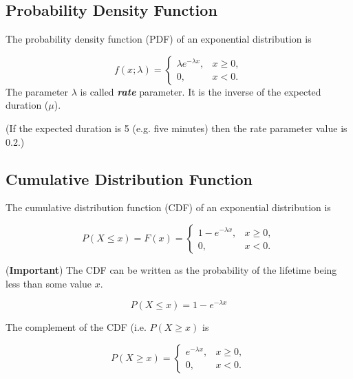 \documentclass[a4paper,12pt]{article}
\begin{document}
\subsection*{Probability Density Function}

\noindent The probability density function (PDF) of an exponential distribution is

\[
f(x;\lambda) = \begin{cases}
\lambda e^{-\lambda x}, & x \ge 0, \\
0, & x < 0.
\end{cases}\]
\noindent The parameter $\lambda$  is called \textbf{\emph{rate}} parameter. It is the inverse of the expected duration ($\mu$).\\ \bigskip

\noindent (If the expected duration is 5 (e.g. five minutes) then the rate parameter value is 0.2.)




\subsection*{Cumulative Distribution Function}
\noindent The cumulative distribution function (CDF) of an exponential distribution is

\[
P(X \leq x) = F(x) = \begin{cases}
1-e^{-\lambda x}, & x \ge 0, \\
0, & x < 0.
\end{cases}\]

\noindent (\textbf{Important}) The CDF can be written as the probability of the lifetime being less than some value $x$.

\[ P(X \leq x) = 1-e^{-\lambda x} \]



\noindent The complement of the CDF (i.e. $P(X \geq x)$ is

\[
P(X \geq x) = \begin{cases}
e^{-\lambda x}, & x \ge 0, \\
0, & x < 0.
\end{cases}\]
\end{document}
